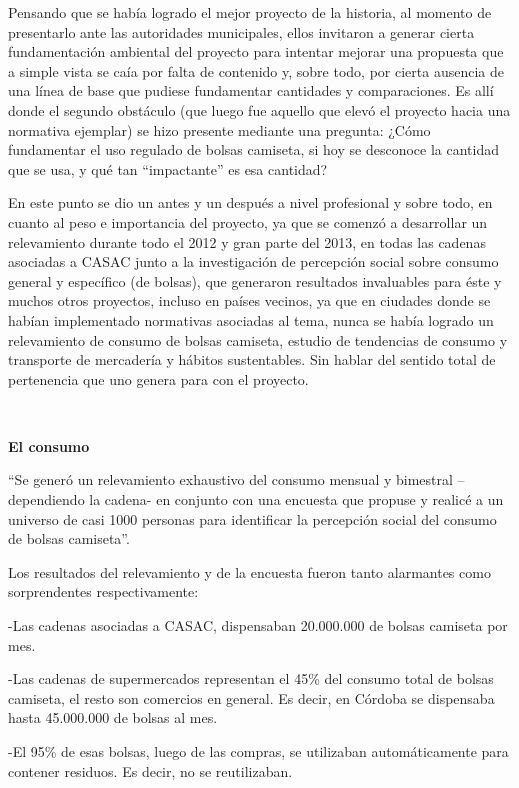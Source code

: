 \begin{fullwidth}
Pensando que se había logrado el mejor proyecto de la historia, al
momento de presentarlo ante las autoridades municipales, ellos invitaron
a generar cierta fundamentación ambiental del proyecto para intentar
mejorar una propuesta que a simple vista se caía por falta de contenido
y, sobre todo, por cierta ausencia de una línea de base que pudiese
fundamentar cantidades y comparaciones. Es allí donde el segundo
obstáculo (que luego fue aquello que elevó el proyecto hacia una
normativa ejemplar) se hizo presente mediante una pregunta: ¿Cómo
fundamentar el uso regulado de bolsas camiseta, si hoy se desconoce la
cantidad que se usa, y qué tan ``impactante'' es esa cantidad?

En este punto se dio un antes y un después a nivel profesional y sobre
todo, en cuanto al peso e importancia del proyecto, ya que se comenzó a
desarrollar un relevamiento durante todo el 2012 y gran parte del 2013,
en todas las cadenas asociadas a CASAC junto a la investigación de
percepción social sobre consumo general y específico (de bolsas), que
generaron resultados invaluables para éste y muchos otros proyectos,
incluso en países vecinos, ya que en ciudades donde se habían
implementado normativas asociadas al tema, nunca se había logrado un
relevamiento de consumo de bolsas camiseta, estudio de tendencias de
consumo y transporte de mercadería y hábitos sustentables. Sin hablar
del sentido total de pertenencia que uno genera para con el proyecto.

~

\textbf{El consumo}

``Se generó un relevamiento exhaustivo del consumo mensual y bimestral
--dependiendo la cadena- en conjunto con una encuesta que propuse y
realicé a un universo de casi 1000 personas para identificar la
percepción social del consumo de bolsas camiseta''.

Los resultados del relevamiento y de la encuesta fueron tanto alarmantes
como sorprendentes respectivamente:

-Las cadenas asociadas a CASAC, dispensaban 20.000.000 de bolsas
camiseta por mes.

-Las cadenas de supermercados representan el 45\% del consumo total de
bolsas camiseta, el resto son comercios en general. Es decir, en Córdoba
se dispensaba hasta 45.000.000 de bolsas al mes.

-El 95\% de esas bolsas, luego de las compras, se utilizaban
automáticamente para contener residuos. Es decir, no se reutilizaban.


\end{fullwidth}
